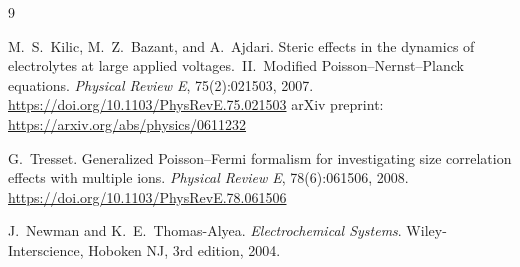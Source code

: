 \documentclass[11pt]{article}
\begin{document}
\begin{thebibliography}{9}

M.~S.~Kilic, M.~Z.~Bazant, and A.~Ajdari.
\newblock Steric effects in the dynamics of electrolytes at large applied
voltages.\ {II}.~{M}odified {P}oisson--{N}ernst--{P}lanck equations.
\newblock \emph{Physical Review E}, 75(2):021503, 2007.
\newblock \url{https://doi.org/10.1103/PhysRevE.75.021503}
\newblock arXiv preprint: \url{https://arxiv.org/abs/physics/0611232}

G.~Tresset.
\newblock Generalized {P}oisson--{F}ermi formalism for investigating size
correlation effects with multiple ions.
\newblock \emph{Physical Review E}, 78(6):061506, 2008.
\newblock \url{https://doi.org/10.1103/PhysRevE.78.061506}

J.~Newman and K.~E.~Thomas-Alyea.
\newblock \emph{Electrochemical Systems}.
\newblock Wiley-Interscience, Hoboken NJ, 3rd edition, 2004.

\end{thebibliography}
\end{document}
